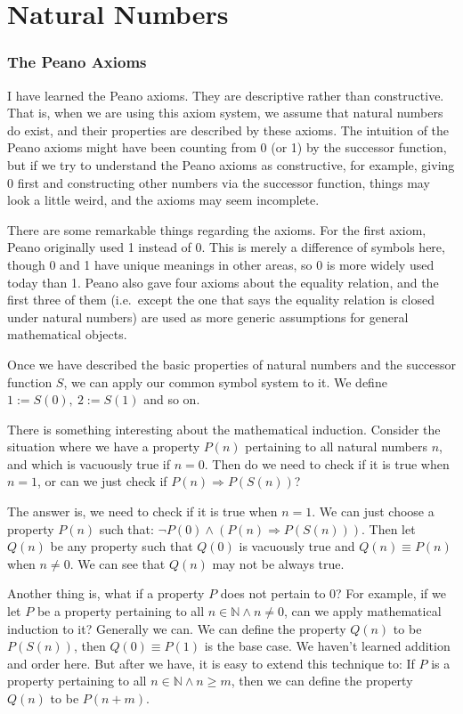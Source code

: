 
\part{Natural Numbers}
\section{The Peano Axioms}
I have learned the Peano axioms. They are descriptive rather than constructive. That is, when we are 
using this axiom system, we assume that natural numbers do exist, and their properties are described by 
these axioms. The intuition of the Peano axioms might have been counting from 0 (or 1) by the successor 
function, but if we try to understand the Peano axioms as constructive, for example, giving 0 first and 
constructing other numbers via the successor function, things may look a little weird, and the axioms 
may seem incomplete.

There are some remarkable things regarding the axioms. For the first axiom, Peano originally used 1 
instead of 0. This is merely a difference of symbols here, though 0 and 1 have unique meanings in other 
areas, so 0 is more widely used today than 1. Peano also gave four axioms about the equality relation, 
and the first three of them (i.e.~except the one that says the equality relation is closed under 
natural numbers) are used as more generic assumptions for general mathematical objects.

Once we have described the basic properties of natural numbers and the successor function $S$, we can 
apply our common symbol system to it. We define $1 := S(0),\ 2 :=S(1)$ and so on.

There is something interesting about the mathematical induction. Consider the situation where we have a 
property $P(n)$ pertaining to all natural numbers $n$, and which is vacuously true if $n=0$. Then do we 
need to check if it is true when $n=1$, or can we just check if $P(n) \Longrightarrow P(S(n))$? 

The answer is, we need to check if it is true when $n=1$. We can just choose a property $P(n)$ such that:
$\neg P(0) \wedge (P(n) \Longrightarrow P(S(n)))$. Then let $Q(n)$ be any property such that $Q(0)$ is 
vacuously true and $Q(n) \equiv P(n)$ when $n \neq 0$. We can see that $Q(n)$ may not be always true.

Another thing is, what if a property $P$ does not pertain to $0$? For example, if we let $P$ be a property 
pertaining to all $n \in \mathbb{N} \wedge n \neq 0$, can we apply mathematical induction to it? Generally 
we can. We can define the property $Q(n)$ to be $P(S(n))$, then $Q(0) \equiv P(1)$ is the base case. We haven't 
learned addition and order here. But after we have, it is easy to extend this technique to: If $P$ is a 
property pertaining to all $n \in \mathbb{N} \wedge n \geq m$, then we can define the property $Q(n)$ to be 
$P(n+m)$.

